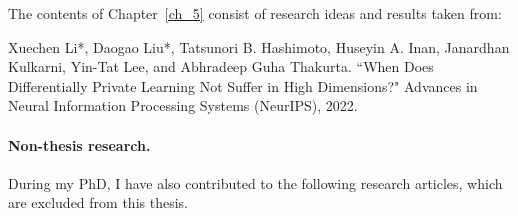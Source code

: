 \noindent The contents of Chapter~\ref{ch_5} consist of research ideas and results taken from:

\begin{mdframed}[leftline=true, topline=false, rightline=false, bottomline=false, linewidth=2pt]
Xuechen Li*, Daogao Liu*, Tatsunori B. Hashimoto, Huseyin A. Inan, Janardhan Kulkarni, Yin-Tat Lee, and Abhradeep Guha Thakurta. ``When Does Differentially Private Learning Not Suffer in High Dimensions?" Advances in Neural Information Processing Systems (NeurIPS), 2022.~\cite{li2022does}
\end{mdframed}


\newpage
\paragraph{Non-thesis research.}
During my PhD, I have also contributed to the following research articles, which are excluded from this thesis.


